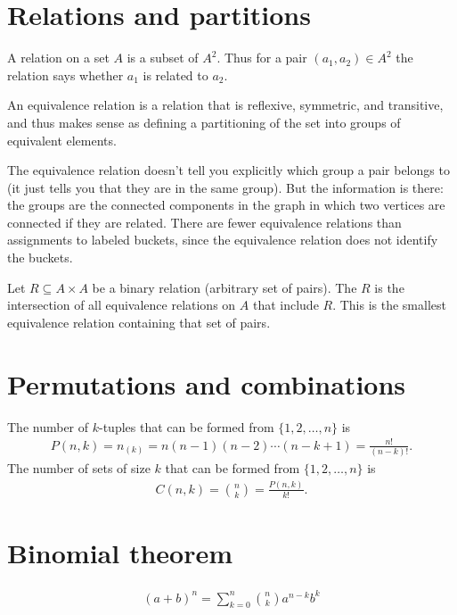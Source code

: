 \section{Relations and partitions}
A relation on a set $A$ is a subset of $A^2$. Thus for a pair
$(a_1, a_2) \in A^2$ the relation says whether $a_1$ is related to $a_2$.

An equivalence relation is a relation that is reflexive, symmetric, and
transitive, and thus makes sense as defining a partitioning of the set into
groups of equivalent elements.

The equivalence relation doesn't tell you explicitly which group a pair belongs
to (it just tells you that they are in the same group). But the information is
there: the groups are the connected components in the graph in which two
vertices are connected if they are related. There are fewer equivalence
relations than assignments to labeled buckets, since the equivalence relation
does not identify the buckets. 

\begin{definition}
  Let $R \subseteq A \times A$ be a binary relation (arbitrary set of pairs). The 
  $R$ is the intersection of all equivalence relations on $A$ that include $R$. This is the smallest
  equivalence relation containing that set of pairs.
\end{definition}




\section{Permutations and combinations}

\begin{theorem*}
  The number of $k$-tuples that can be formed from $\{1, 2, \ldots, n\}$ is
  \begin{align*}
    P(n, k) = n_{(k)} = n(n-1)(n-2)\cdots(n-k+1) = \frac{n!}{(n - k)!}.
  \end{align*}
  The number of sets of size $k$ that can be formed from $\{1, 2, \ldots, n\}$ is
  \begin{align*}
    C(n, k) = {n \choose k} = \frac{P(n, k)}{k!}.
  \end{align*}
\end{theorem*}

\section{Binomial theorem}
\begin{align*}
  (a + b)^n = \sum_{k=0}^n{n \choose k}a^{n-k}b^k
\end{align*}


